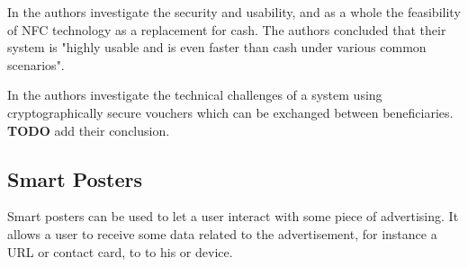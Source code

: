 
In \cite{1555846} the authors investigate the security and usability, and as a whole the feasibility of NFC technology as a replacement for cash.
The authors concluded that their system is "highly usable and is even faster than cash under various common scenarios".

In \cite{1592613} the authors investigate the technical challenges of a system using cryptographically secure vouchers which can be exchanged between beneficiaries.
\textbf{TODO} add their conclusion.

\subsection{Smart Posters}
Smart posters can be used to let a user interact with some piece of advertising.
It allows a user to receive some data related to the advertisement, for instance a URL or contact card, to to his or device.





